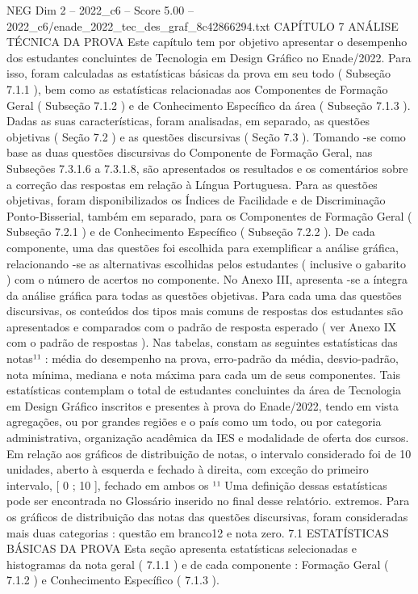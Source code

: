 \begin{textsample}{NEG Dim 2 – 2022\_c6 – Score 5.00 – 2022\_c6/enade\_2022\_tec\_des\_graf\_8c42866294.txt}  \label{ex:f2_neg_300}
CAPÍTULO 7 ANÁLISE TÉCNICA DA PROVA Este capítulo tem por objetivo apresentar o desempenho dos estudantes concluintes de Tecnologia em Design Gráfico no Enade/2022.
Para isso, foram calculadas as estatísticas básicas da prova em seu todo ( Subseção 7.1.1 ), bem como as estatísticas relacionadas aos Componentes de Formação Geral ( Subseção 7.1.2 ) e de Conhecimento Específico da área ( Subseção 7.1.3 ).
Dadas as suas características, foram analisadas, em separado, as questões objetivas ( Seção 7.2 ) e as questões discursivas ( Seção 7.3 ).
Tomando -se como base as duas questões discursivas do Componente de Formação Geral, nas Subseções 7.3.1.6 a 7.3.1.8, são apresentados os resultados e os comentários sobre a correção das respostas em relação à Língua Portuguesa.
Para as questões objetivas, foram disponibilizados os Índices de Facilidade e de Discriminação Ponto-Bisserial, também em separado, para os Componentes de Formação Geral ( Subseção 7.2.1 ) e de Conhecimento Específico ( Subseção 7.2.2 ).
De cada componente, uma das questões foi escolhida para exemplificar a análise gráfica, relacionando -se as alternativas escolhidas pelos estudantes ( inclusive o gabarito ) com o número de acertos no componente.
No Anexo III, apresenta -se a íntegra da análise gráfica para todas as questões objetivas.
Para cada uma das questões discursivas, os conteúdos dos tipos mais comuns de respostas dos estudantes são apresentados e comparados com o padrão de resposta esperado ( ver Anexo IX com o padrão de respostas ).
Nas tabelas, constam as seguintes estatísticas das notas¹¹ : média do desempenho na prova, erro-padrão da média, desvio-padrão, nota mínima, mediana e nota máxima para cada um de seus componentes.
Tais estatísticas contemplam o total de estudantes concluintes da área de Tecnologia em Design Gráfico inscritos e presentes à prova do Enade/2022, tendo em vista agregações, ou por grandes regiões e o país como um todo, ou por categoria administrativa, organização acadêmica da IES e modalidade de oferta dos cursos.
Em relação aos gráficos de distribuição de notas, o intervalo considerado foi de 10 unidades, aberto à esquerda e fechado à direita, com exceção do primeiro intervalo, [ 0 ; 10 ], fechado em ambos os ¹¹ Uma definição dessas estatísticas pode ser encontrada no Glossário inserido no final desse relatório. extremos.
Para os gráficos de distribuição das notas das questões discursivas, foram consideradas mais duas categorias : questão em branco12 e nota zero. 7.1 ESTATÍSTICAS BÁSICAS DA PROVA Esta seção apresenta estatísticas selecionadas e histogramas da nota geral ( 7.1.1 ) e de cada componente : Formação Geral ( 7.1.2 ) e Conhecimento Específico ( 7.1.3 ).

\end{textsample}
